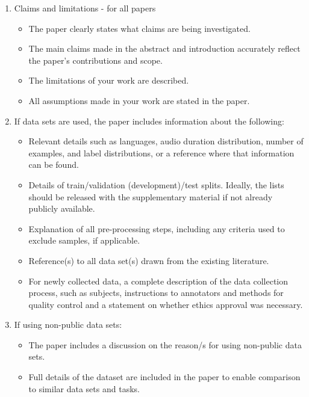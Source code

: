 \documentclass{Interspeech2024}
\begin{document}
\begin{enumerate}

\item Claims and limitations - for all papers
\begin{itemize}

\item The paper clearly states what claims are being investigated.
\item The main claims made in the abstract and introduction accurately reflect the paper’s contributions and scope.
\item The limitations of your work are described.
\item All assumptions made in your work are stated in the paper.
 \end{itemize}

\item If data sets are used, the paper includes information about the following:
\begin{itemize}
\item Relevant details such as languages, audio duration distribution, number of examples, and label distributions, or a reference where that information can be found.
\item Details of train/validation (development)/test splits. Ideally, the lists should be released with the supplementary material if not already publicly available.
\item Explanation of all pre-processing steps, including any criteria used to exclude samples, if applicable.
\item Reference(s) to all data set(s) drawn from the existing literature.
\item For newly collected data, a complete description of the data collection process, such as subjects, instructions to annotators and methods for quality control and a statement on whether ethics approval was necessary.
\end{itemize}

\item If using non-public data sets:
\begin{itemize}
\item The paper includes a discussion on the reason/s for using non-public data sets.
\item Full details of the dataset are included in the paper to enable comparison to similar data sets and tasks.
\end{itemize}



\end{enumerate}
\end{document}

